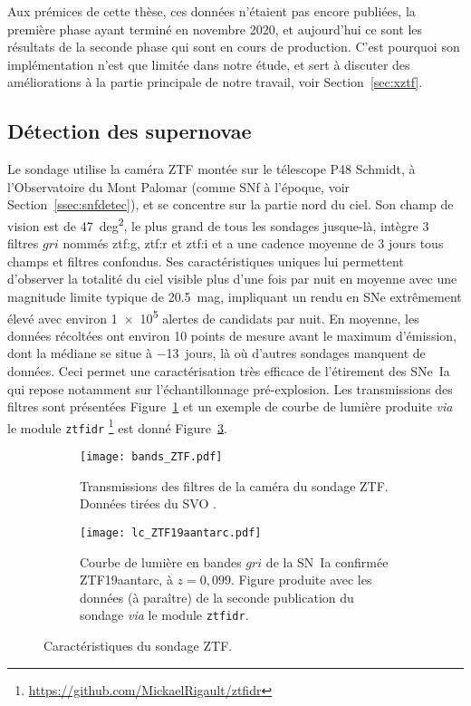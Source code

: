 \documentclass[../main/main.tex]{subfiles}
\begin{document}
Aux prémices de cette thèse, ces données n'étaient pas encore publiées, la
première phase ayant terminé en novembre 2020, et aujourd'hui ce sont les
résultats de la seconde phase qui sont en cours de production. C'est pourquoi
son implémentation n'est que limitée dans notre étude, et sert à discuter des
améliorations à la partie principale de notre travail, voir
Section~\ref{sec:xztf}.

\subsection{Détection des supernovae}\label{ssec:ztfdetec}

Le sondage utilise la caméra ZTF montée sur le télescope P48 Schmidt, à
l'Observatoire du Mont Palomar (comme SNf à l'époque, voir
Section~\ref{ssec:snfdetec}), et se concentre sur la partie nord du ciel. Son
champ de vision est de \SI{47}{deg^2}, le plus grand de tous les sondages
jusque-là, intègre 3 filtres $gri$ nommés ztf:g, ztf:r et ztf:i et a une cadence
moyenne de 3 jours tous champs et filtres confondus. Ses caractéristiques
uniques lui permettent d'observer la totalité du ciel visible plus d'une fois
par nuit en moyenne avec une magnitude limite typique de \SI{20.5}{mag},
impliquant un rendu en SNe extrêmement élevé avec environ \num{1e5} alertes de
candidats par nuit. En moyenne, les données récoltées ont environ 10 points de
mesure avant le maximum d'émission, dont la médiane se situe à \SI{-13}{jours},
là où d'autres sondages manquent de données. Ceci permet une caractérisation
très efficace de l'étirement des SNe~Ia qui repose notamment sur
l'échantillonnage pré-explosion. Les transmissions des filtres sont présentées
Figure~\ref{fig:ztfbands} et un exemple de courbe de lumière produite
\textit{via} le module \texttt{ztfidr}
\footnote{\label{fn:ztfidr}\href{https://github.com/MickaelRigault/ztfidr}
{https://github.com/MickaelRigault/ztfidr}} est donné Figure~\ref{fig:ztflc}.

\begin{figure}[ht]
    \centering
    \begin{subfigure}[]{.49\linewidth}
        \centering
        \texttt{[image: bands\_ZTF.pdf]}
        \caption[Transmissions des filtres de la caméra du sondage ZTF]
        {Transmissions des filtres de la caméra du sondage ZTF. Données tirées
        du SVO \citep{rodrigo2020}.}
        \label{fig:ztfbands}
    \end{subfigure}
    \hfill
    \begin{subfigure}[]{.49\linewidth}
        \centering
        \texttt{[image: lc\_ZTF19aantarc.pdf]}
        \caption[Courbe de lumière de la SN ZTF19aantarc]{Courbe de lumière en
            bandes $gri$ de la SN~Ia confirmée ZTF19aantarc, à $z = 0,099$.
            Figure produite avec les données (à paraître) de la seconde
            publication du sondage \textit{via} le module
        \texttt{ztfidr}.}
        \label{fig:ztflc}
    \end{subfigure}
    \caption{Caractéristiques du sondage ZTF.}
\end{figure}
\end{document}
